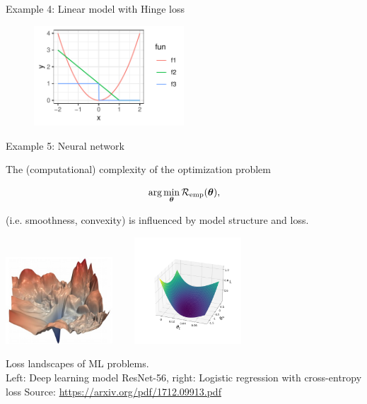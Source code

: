 \begin{vbframe}{Example 4: Linear model with Hinge loss}
\vspace*{-0.3cm}
\begin{figure}
	\begin{center}
		\includegraphics[width=0.5\textwidth]{figure_man/hinge_vs_l2.pdf}
	\end{center}
\end{figure}


\end{vbframe}


\begin{vbframe}{Example 5: Neural network}

The (computational) complexity of the optimization problem 

$$
\text{arg} \min_{\bm{\theta}} \mathcal{R}_{\text{emp}}(\bm{\theta}),
$$

(i.e. smoothness, convexity) is influenced by model structure and loss. 		
\vspace*{-0.3cm}
\begin{center}
		\includegraphics[width=0.3\textwidth]{figure_man/ml_landscape.jpg} ~~~ \includegraphics[width=0.3\textwidth]{figure_man/log_reg.png}
	\begin{footnotesize}
		\newline
		Loss landscapes of ML problems. \\ Left: Deep learning model ResNet-56, right: Logistic regression with cross-entropy loss
		\newline
		Source: \url{https://arxiv.org/pdf/1712.09913.pdf}
	\end{footnotesize}
\end{center}	

\end{vbframe}


\endlecture


